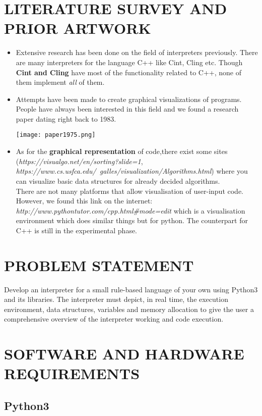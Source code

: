 \documentclass{article}
\begin{document}
\section{LITERATURE SURVEY AND PRIOR ARTWORK}
\begin{itemize}
\item Extensive research has been done on the field of interpreters previously. There are many interpreters for the language C++ like Cint, Cling etc. Though {\bf Cint and Cling} have most of the functionality related to C++, none of them implement \textit{all} of them. 


\item Attempts have been made to create graphical visualizations of programs. People have always been interested in this field and we found a research paper\cite{paper} dating right back to 1983.

\texttt{[image: paper1975.png]}

\item As for the {\bf graphical representation} of code,there exist some sites (\textit {https://visualgo.net/en/sorting?slide=1}, \textit {https://www.cs.usfca.edu/~galles/visualization/Algorithms.html}) where you can visualize basic data structures for already decided algorithms. \\There are not many platforms that allow visualisation of user-input code. However, we found this link on the internet: \textit {http://www.pythontutor.com/cpp.html\#mode=edit} which is a visualisation environment which does similar things but for python. The counterpart for C++ is still in the experimental phase.

\end{itemize}
\section{PROBLEM STATEMENT} 
Develop an interpreter for a small rule-based language of your own using Python3 and its libraries. The interpreter must depict, in real time, the execution environment, data structures, variables and memory allocation to give the user a comprehensive overview of the interpreter working and code execution.
\section{SOFTWARE AND HARDWARE REQUIREMENTS}

\subsection{Python3}
\end{document}
